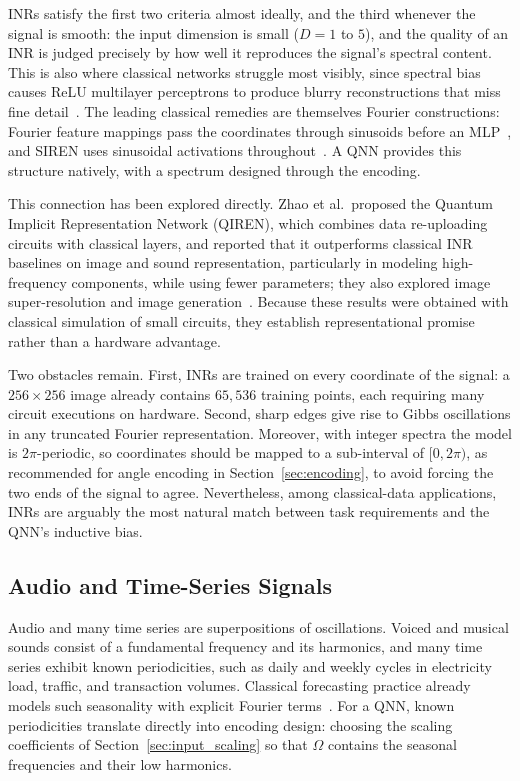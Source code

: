 \documentclass[12pt]{article}
\numberwithin{equation}{section}  %
\begin{document}
INRs satisfy the first two criteria almost ideally, and the third whenever the signal is smooth: the input dimension is small ($D = 1$ to $5$), and the quality of an INR is judged precisely by how well it reproduces the signal's spectral content. This is also where classical networks struggle most visibly, since spectral bias causes ReLU multilayer perceptrons to produce blurry reconstructions that miss fine detail~\cite{rahaman2019spectral}. The leading classical remedies are themselves Fourier constructions: Fourier feature mappings pass the coordinates through sinusoids before an MLP~\cite{tancik2020fourier}, and SIREN uses sinusoidal activations throughout~\cite{sitzmann2020implicit}. A QNN provides this structure natively, with a spectrum designed through the encoding.

This connection has been explored directly. Zhao et al.\ proposed the Quantum Implicit Representation Network (QIREN), which combines data re-uploading circuits with classical layers, and reported that it outperforms classical INR baselines on image and sound representation, particularly in modeling high-frequency components, while using fewer parameters; they also explored image super-resolution and image generation~\cite{zhao2024quantum}. Because these results were obtained with classical simulation of small circuits, they establish representational promise rather than a hardware advantage.

Two obstacles remain. First, INRs are trained on every coordinate of the signal: a $256 \times 256$ image already contains $65{,}536$ training points, each requiring many circuit executions on hardware. Second, sharp edges give rise to Gibbs oscillations in any truncated Fourier representation. Moreover, with integer spectra the model is $2\pi$-periodic, so coordinates should be mapped to a sub-interval of $[0, 2\pi)$, as recommended for angle encoding in Section~\ref{sec:encoding}, to avoid forcing the two ends of the signal to agree. Nevertheless, among classical-data applications, INRs are arguably the most natural match between task requirements and the QNN's inductive bias.

\subsection{Audio and Time-Series Signals}
\label{sec:app_timeseries}

Audio and many time series are superpositions of oscillations. Voiced and musical sounds consist of a fundamental frequency and its harmonics, and many time series exhibit known periodicities, such as daily and weekly cycles in electricity load, traffic, and transaction volumes. Classical forecasting practice already models such seasonality with explicit Fourier terms~\cite{hyndman2021forecasting}. For a QNN, known periodicities translate directly into encoding design: choosing the scaling coefficients of Section~\ref{sec:input_scaling} so that $\Omega$ contains the seasonal frequencies and their low harmonics.
\end{document}
